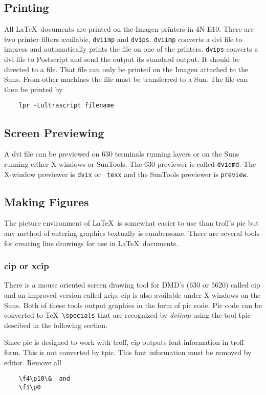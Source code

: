 \subsection{Printing}
All \LaTeX\ documents are printed on the Imagen printers in 4N-E10.
There are two printer filters available, {\tt dviimp} and {\tt dvips}.
{\tt dviimp} converts a dvi file to impress and automatically prints
the file on one of the printers.  {\tt dvips} converts a dvi file to
Postscript and send the output its standard output.  It should be
directed to a file.  That file can only be printed on the Imagen
attached to the Suns.  From other machines the file must be
transferred to a Sun.  The file can then be printed by
\begin{verbatim}
	lpr -Lultrascript filename
\end{verbatim}
\subsection{Screen Previewing}
A dvi file can be previewed on 630 terminals running layers or on the
Suns running either X-windows or SunTools.  The 630 previewer is
called {\tt dvidmd}.  The X-window previewer is {\tt dvix} or {\tt
texx} and the SunTools previewer is {\tt preview}.
\subsection{Making Figures}
The picture environment of \LaTeX\ is somewhat easier to use than
troff's pic but any method of entering graphics textually is
cumbersome.  There are several tools for creating line drawings for
use in \LaTeX\ documents.
\subsubsection{cip or xcip}
There is a mouse oriented screen drawing tool for DMD's (630 or 5620)
called cip and an improved version called xcip.  cip is also available
under X-windows on the Suns.  Both of these tools output graphics in
the form of pic code.  Pic code can be converted to \TeX\
\verb|\specials| that are recognized by {\it dviimp} using the tool
tpic descibed in the following section.  

Since pic is designed to work
with troff, cip outputs font information in troff form.  This is not
converted by tpic.  This font information must be removed by editor.
Remove all 
\begin{verbatim}
	\f4\p10\&  and
	\f1\p0
\end{verbatim}
